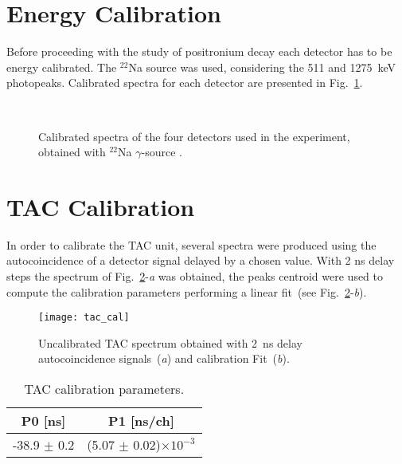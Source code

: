 \newpage
\section*{Energy Calibration}

Before proceeding with the study of positronium decay each detector has to be energy calibrated. The $^{22}$Na source was used, considering the 511 and  1275~keV photopeaks. Calibrated spectra for each detector are presented in Fig.~\ref{Fig:Calibrated_spectra}.

\begin{figure}[h!]
	\centering
	 \quad
		 \quad 
		 \quad
		 \\
	\caption{Calibrated spectra of the four detectors used in the experiment, obtained with $^{22}$Na $\gamma$-source .}
	\label{Fig:Calibrated_spectra}
\end{figure}

\section*{TAC Calibration}

In order to calibrate the TAC unit, several spectra were produced using the autocoincidence of a detector signal delayed by a chosen
value. With 2 ns delay steps the spectrum of Fig.~\ref{Fig:Tac_calibration}-\emph{a} was obtained, the peaks
centroid were used to compute the calibration parameters performing a linear fit~(see Fig.~\ref{Fig:Tac_calibration}-\emph{b}).

\begin{figure}[H]
\centering
\texttt{[image: tac\_cal]}
\caption{Uncalibrated TAC spectrum obtained with 2~ns delay autocoincidence signals~(\emph{a}) and calibration Fit~(\emph{b}).}
\label{Fig:Tac_calibration}
\end{figure}

\begin{table}[H]
\centering
\begin{tabular}{cc}
\toprule
P0 [ns] & P1 [ns/ch] \\
\midrule
-38.9 $\pm$ 0.2 & (5.07 $\pm$ 0.02)$\times 10^{-3}$\\
\bottomrule
\end{tabular}
\caption{TAC calibration parameters.}
\label{Tab: tac calibration parameters}
\end{table}
